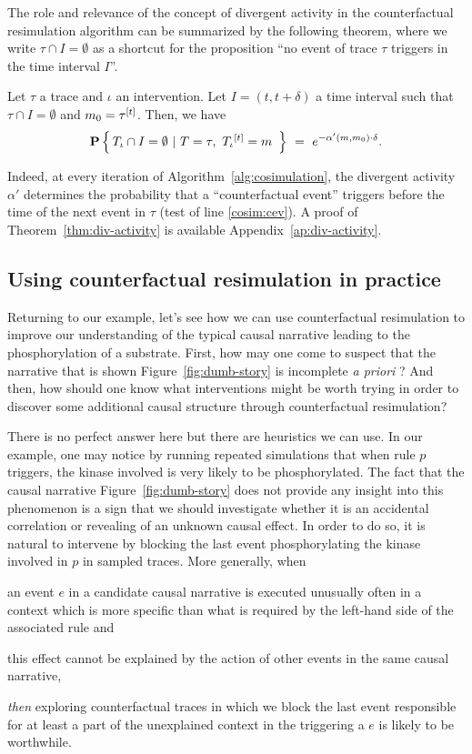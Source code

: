 

The role and relevance of the concept of divergent activity in the
counterfactual resimulation algorithm can be summarized by the
following theorem, where we write $\tau \cap I = \emptyset$ as a
shortcut for the proposition ``no event of trace $\tau$ triggers in
the time interval $I$''.
\begin{theorem}\label{thm:div-activity}
  Let $\tau$ a trace
  and $\iota$ an intervention. Let $I = (t, t+\delta)$ a time interval
  such that $\tau \cap I = \emptyset$ and $m_0 =
  \tau^{[t]}$. Then, we have
  \[\mathbf{P} \left\{\,  {T_\iota}{} \cap I = \emptyset  \ |\  T=\tau,\
      {T_\iota}{}^{[t]} = m\  \,\right\}
    \ =\ e^{-\alpha'(m, m_0) \cdot \delta}.
  \]
\end{theorem}
\noindent Indeed, at every iteration of
Algorithm~\ref{alg:cosimulation}, the divergent activity $\alpha'$
determines the probability that a ``counterfactual event'' triggers
before the time of the next event in $\tau$ (test of line
\ref{cosim:cev}).  A proof of Theorem~\ref{thm:div-activity} is
available Appendix~\ref{ap:div-activity}.




\subsection{Using counterfactual resimulation in practice}
\label{subsec:cosim-practice}

Returning to our example, let's see how we can use counterfactual
resimulation to improve our understanding of the typical causal
narrative leading to the phosphorylation of a substrate. First, how
may one come to suspect that the narrative that is shown
Figure~\ref{fig:dumb-story} is incomplete \textit{a priori} ? And
then, how should one know what interventions might be worth trying in
order to discover some additional causal structure through
counterfactual resimulation?

There is no perfect answer here but there are heuristics we can
use. In our example, one may notice by running repeated simulations
that when rule $p$ triggers, the kinase involved is very likely to be
phosphorylated. The fact that the causal narrative
Figure~\ref{fig:dumb-story} does not provide any insight into this
phenomenon is a sign that we should investigate whether it is
an accidental correlation or revealing of an unknown causal effect. In
order to do so, it is natural to intervene by blocking the last event
phosphorylating the kinase involved in $p$ in sampled traces. More
generally, when
\begin{inparaenum}[(i)]
\item an event $e$ in a candidate causal narrative is executed
  unusually often in a context which is more specific than what is
  required by the left-hand side of the associated rule and
\item this effect cannot be explained by the action of other events in
  the same causal narrative,
\end{inparaenum}
\textit{then} exploring counterfactual traces in which we block the last event
responsible for at least a part of the unexplained context in the
triggering a $e$ is likely to be worthwhile.

